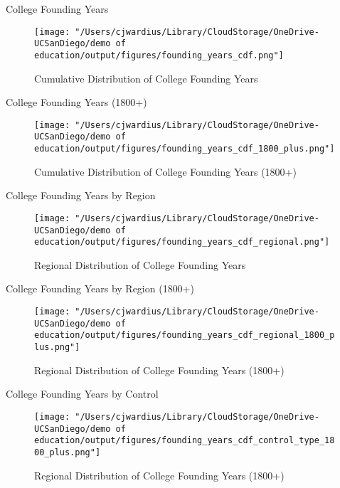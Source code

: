 \documentclass[notes,11pt, aspectratio=169]{beamer}
\begin{document}
\begin{frame}{College Founding Years}
    \begin{figure}
        \centering
        \texttt{[image: "/Users/cjwardius/Library/CloudStorage/OneDrive-UCSanDiego/demo of education/output/figures/founding\_years\_cdf.png"]}
        \caption{Cumulative Distribution of College Founding Years}
    \end{figure}
\end{frame}


\begin{frame}{College Founding Years (1800+)}
    \begin{figure}
        \centering
        \texttt{[image: "/Users/cjwardius/Library/CloudStorage/OneDrive-UCSanDiego/demo of education/output/figures/founding\_years\_cdf\_1800\_plus.png"]}
        \caption{Cumulative Distribution of College Founding Years (1800+)}
    \end{figure}
\end{frame}


\begin{frame}{College Founding Years by Region}
    \begin{figure}
        \centering
        \texttt{[image: "/Users/cjwardius/Library/CloudStorage/OneDrive-UCSanDiego/demo of education/output/figures/founding\_years\_cdf\_regional.png"]}
        \caption{Regional Distribution of College Founding Years}
    \end{figure}
\end{frame}

\begin{frame}{College Founding Years by Region (1800+)}
    \begin{figure}
        \centering
        \texttt{[image: "/Users/cjwardius/Library/CloudStorage/OneDrive-UCSanDiego/demo of education/output/figures/founding\_years\_cdf\_regional\_1800\_plus.png"]}
        \caption{Regional Distribution of College Founding Years (1800+)}
    \end{figure}
\end{frame}

\begin{frame}{College Founding Years by Control}
    \begin{figure}
        \centering
        \texttt{[image: "/Users/cjwardius/Library/CloudStorage/OneDrive-UCSanDiego/demo of education/output/figures/founding\_years\_cdf\_control\_type\_1800\_plus.png"]}
        \caption{Regional Distribution of College Founding Years (1800+)}
    \end{figure}
\end{frame}
\end{document}
